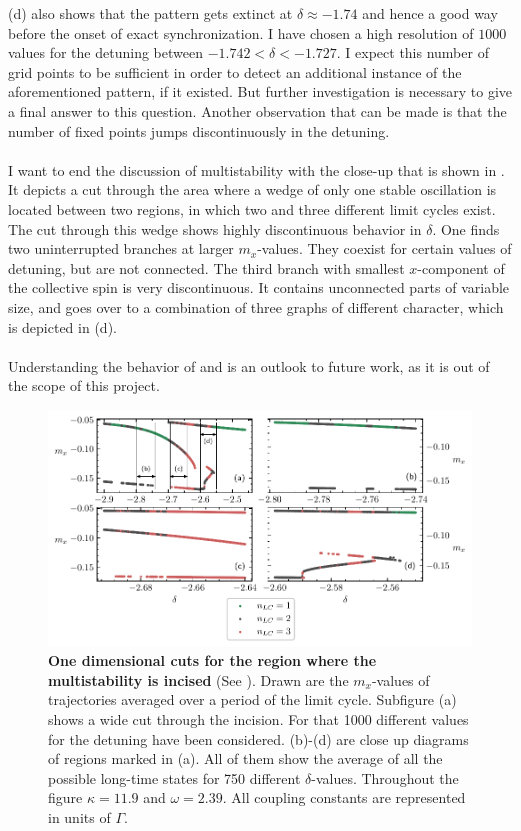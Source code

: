 (d) also shows that the pattern gets extinct at $\delta\approx-1.74$ and hence a good way before the onset of exact synchronization. I have chosen a high resolution of $1000$ values for the detuning between $-1.742<\delta<-1.727$. I expect this number of grid points to be sufficient in order to detect an additional instance of the aforementioned pattern, if it existed. But further investigation is necessary to give a final answer to this question. Another observation that can be made is that the number of fixed points jumps discontinuously in the detuning.\\\\
I want to end the discussion of multistability with the close-up that is shown in . It depicts a cut through the area where a wedge of only one stable oscillation is  located between two regions, in which two and three different limit cycles exist. The cut through this wedge shows highly discontinuous behavior in $\delta$. One finds two uninterrupted branches at larger $m_x$-values. They coexist for certain values of detuning, but are not connected. The third branch with smallest $x$-component of the collective spin is very discontinuous. It contains unconnected parts of variable size, and goes over to a combination of three graphs of different character, which is depicted in (d). \\\\Understanding the behavior of  and  is an outlook to future work, as it is out of the scope of this project.
\begin{figure}[H]
    \hspace*{-1.2cm}
    \includegraphics{pictures/multistab_line_bay.pdf}
    \caption{\textbf{One dimensional cuts for the region where the multistability is incised} (See ). Drawn are the $m_x$-values of trajectories averaged over a period of the limit cycle. Subfigure (a) shows a wide cut through the incision. For that 1000 different values for the detuning have been considered. (b)-(d) are close up diagrams of regions marked in (a). All of them show the average of all the possible long-time states for 750 different $\delta$-values. Throughout the figure $\kappa=11.9$ and $\omega=2.39$. All coupling constants are represented in units of $\Gamma$.}
    \label{fig:delcut_bay}
\end{figure}
